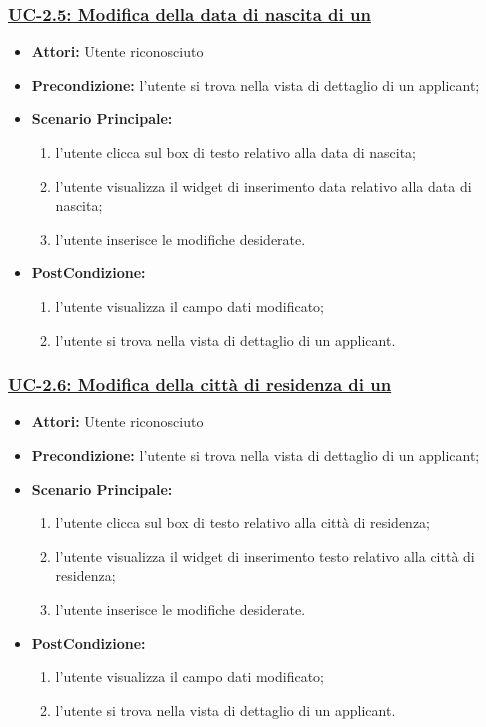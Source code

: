 \subsubsection{\underline{UC-2.5: Modifica della data di nascita di un \applicant}}
\begin{itemize}
	\item \textbf{Attori:} Utente riconosciuto
	\item \textbf{Precondizione:}  l'utente si trova nella vista di dettaglio di un applicant;
	\item \textbf{Scenario Principale:}
	\begin{enumerate}
		\item l'utente clicca sul box di testo relativo alla data di nascita;
		\item l'utente visualizza il  widget di inserimento data relativo alla data di nascita;
		\item l'utente inserisce le modifiche desiderate.
	\end{enumerate}
	\item \textbf{PostCondizione:} 
	\begin{enumerate}
		\item l'utente visualizza il campo dati modificato;
		\item l'utente si trova nella vista di dettaglio di un applicant.
	\end{enumerate}
	
\end{itemize}


\subsubsection{\underline{UC-2.6: Modifica della città di residenza di un \applicant}}
\begin{itemize}
	\item \textbf{Attori:} Utente riconosciuto
	\item \textbf{Precondizione:}  l'utente si trova nella vista di dettaglio di un applicant;
	\item \textbf{Scenario Principale:}
	\begin{enumerate}
		\item l'utente clicca sul box di testo relativo alla città di residenza;
		\item l'utente visualizza il  widget di inserimento testo relativo alla città di residenza;
		\item l'utente inserisce le modifiche desiderate.
	\end{enumerate}
	\item \textbf{PostCondizione:} 
	\begin{enumerate}
		\item l'utente visualizza il campo dati modificato;
		\item l'utente si trova nella vista di dettaglio di un applicant.
	\end{enumerate}
	
\end{itemize}

